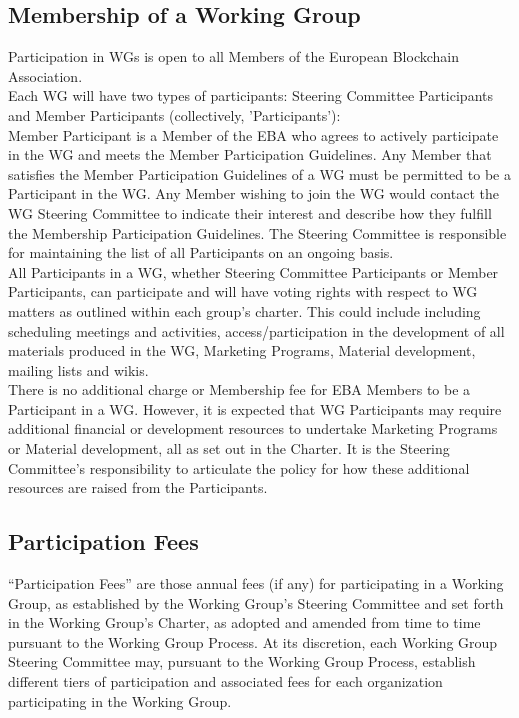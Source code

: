 \documentclass{article}
\begin{document}
\subsection{Membership of a Working Group}

Participation in WGs is open to all Members of the European Blockchain Association. \\
Each WG will have two types of participants: Steering Committee Participants and Member Participants (collectively, 'Participants'): \\
Member Participant is a Member of the EBA who agrees to actively participate in the WG and meets the Member Participation Guidelines. 
Any Member that satisfies the Member Participation Guidelines of a WG must be permitted to be a Participant in the WG. 
Any Member wishing to join the WG would contact the WG Steering Committee to indicate their interest and describe how they fulfill the Membership Participation Guidelines. 
The Steering Committee is responsible for maintaining the list of all Participants on an ongoing basis. \\
All Participants in a WG, whether Steering Committee Participants or Member Participants, can participate and will have voting rights with respect to WG matters as outlined within each group's charter. 
This could include including scheduling meetings and activities, access/participation in the development of all materials produced in the WG, Marketing Programs, Material development, mailing lists and wikis. \\
There is no additional charge or Membership fee for EBA Members to be a Participant in a WG. 
However, it is expected that WG Participants may require additional financial or development resources to undertake Marketing Programs or Material development, all as set out in the Charter. 
It is the Steering Committee's responsibility to articulate the policy for how these additional resources are raised from the Participants.

\subsection{Participation Fees}

“Participation Fees” are those annual fees (if any) for participating in a Working Group, as established by the Working Group’s Steering Committee and set forth in the Working Group’s Charter, as adopted and amended from time to time pursuant to the Working Group Process. 
At its discretion, each Working Group Steering Committee may, pursuant to the Working Group Process, establish different tiers of participation and associated fees for each organization participating in the Working Group.
\end{document}
